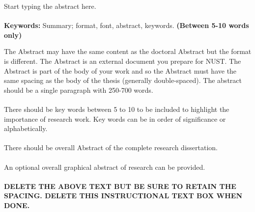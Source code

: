 \documentclass{article}
\begin{document}
Start typing the abstract here.\\~\\
{\bf Keywords:}	Summary; format, font, abstract, keywords. {\bf (Between 5-10 words only)}
\begin{tcolorbox}[enhanced jigsaw,
    sharp corners,
    boxrule=0.5pt, 
    colback=blue!30!white,   
    borderline={0.5pt}{-2pt}{black,solid} %
 ]
 \begin{justify}
 The Abstract may have the same content as the doctoral Abstract but the format is different. The Abstract is an external document you prepare for NUST. The Abstract is part of the body of your work and so the Abstract must have the same spacing as the body of the thesis (generally double-spaced). The abstract should be a single paragraph with 250-700 words.\\~\\
There should be key words between 5 to 10 to be included to highlight the importance of research work. Key words can be in order of significance or alphabetically.\\~\\
There should be overall Abstract of the complete research dissertation.\\~\\ 
An optional overall graphical abstract of research can be provided.\\~\\
\bf{DELETE THE ABOVE TEXT BUT BE SURE TO RETAIN THE SPACING.}
{\bf DELETE THIS INSTRUCTIONAL TEXT BOX WHEN DONE.}
\end{justify}
\end{tcolorbox}
\pagebreak
\end{document}
